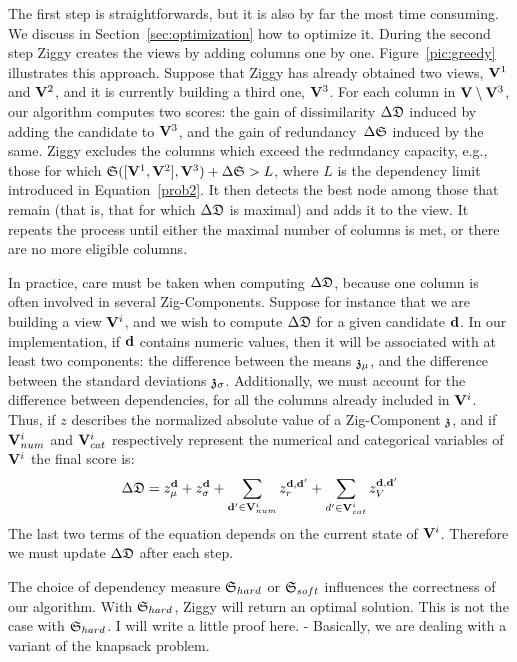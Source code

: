 The first step is straightforwards, but it is also by far the most time
consuming. We discuss in Section~\ref{sec:optimization} how to optimize it.
During the second step Ziggy creates the views by adding columns one by one.
Figure~\ref{pic:greedy} illustrates this approach. Suppose that Ziggy has
already obtained two views, $\mathbf{V}^1$ and $\mathbf{V}^2$, and it is currently
building a third one, $\mathbf{V}^3$. For each column in $\mathbf{V} \setminus \mathbf{V}^3
$, our algorithm computes two scores: the gain of dissimilarity $\Delta\mathfrak{D}$
induced by adding the candidate to $\mathbf{V}^3$, and the gain of
redundancy~$\Delta\mathfrak{S}$ induced by the same. Ziggy excludes the columns which
exceed the redundancy capacity, e.g., those for which $\mathfrak{S}([\mathbf{V}^1,
\mathbf{V}^2], \mathbf{V}^3) + \Delta\mathfrak{S} > L$, where $L$ is the dependency limit
introduced in Equation~\ref{prob2}. It then detects the best node among those
that remain (that is, that for which $\Delta\mathfrak{D}$ is maximal) and adds it to
the view. It repeats the process until either the maximal number of columns is
met, or there are no more eligible columns.

In practice, care must be taken when computing $\Delta\mathfrak{D}$, because one
column is often involved in several Zig-Components. Suppose for instance that we
are building a view $\mathbf{V}^{i}$, and we wish to compute $\Delta\mathfrak{D}$ for
a given candidate $\bf{d}$.  In our
implementation, if $\bf{d}$ contains numeric values, then it will be associated with
at least two components: the difference between the means $\mathfrak{z}_\mu$, and the
difference between the standard deviations $\mathfrak{z}_\sigma$.  Additionally, we must
account for the difference between dependencies, for all the columns
already included in $\mathbf{V}^{i}$. Thus, if $z$ describes the normalized absolute
value of a Zig-Component $\mathfrak{z}$, and if $\mathbf{V}^{i}_{num}$ and
$\mathbf{V}^{i}_{cat}$ respectively represent the numerical and categorical
variables of $\mathbf{V}^{i}$ the final score is:
    \begin{multline}
\Delta\mathfrak{D} = 
z_\mu^{\bf{d}}+ z_\sigma^{\bf{d}} +
\sum_{\mathbf{d}' \in \mathbf{V}^i_{num}} z_r^{\mathbf{d}, \mathbf{d}'}
+ \sum_{d' \in \mathbf{V}^i_{cat}} z_V^{\mathbf{d}, \mathbf{d}'}
\end{multline}
The last two terms of the equation depends on the current state of $ \mathbf{V}^i$.
Therefore we must update $\Delta\mathfrak{D}$ after each step.


The choice of dependency measure $\mathfrak{S}_{hard}$ or  $\mathfrak{S}_{soft}$ influences
the correctness of our algorithm. With $\mathfrak{S}_{hard}$, Ziggy will return an
optimal solution. This is not the case with $\mathfrak{S}_{hard}$.  {\color{red} I
    will write a little proof here. - Basically, we are dealing with a variant
of the knapsack problem.}

